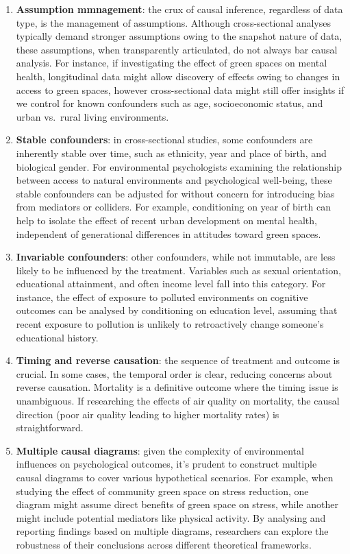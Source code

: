 \documentclass[
  singlecolumn]{article}
\begin{document}
\begin{enumerate}
\def\labelenumi{\arabic{enumi}.}
\item
  \textbf{Assumption mmnagement}: the crux of causal inference,
  regardless of data type, is the management of assumptions. Although
  cross-sectional analyses typically demand stronger assumptions owing
  to the snapshot nature of data, these assumptions, when transparently
  articulated, do not always bar causal analysis. For instance, if
  investigating the effect of green spaces on mental health,
  longitudinal data might allow discovery of effects owing to changes in
  access to green spaces, however cross-sectional data might still offer
  insights if we control for known confounders such as age,
  socioeconomic status, and urban vs.~rural living environments.
\item
  \textbf{Stable confounders}: in cross-sectional studies, some
  confounders are inherently stable over time, such as ethnicity, year
  and place of birth, and biological gender. For environmental
  psychologists examining the relationship between access to natural
  environments and psychological well-being, these stable confounders
  can be adjusted for without concern for introducing bias from
  mediators or colliders. For example, conditioning on year of birth can
  help to isolate the effect of recent urban development on mental
  health, independent of generational differences in attitudes toward
  green spaces.
\item
  \textbf{Invariable confounders}: other confounders, while not
  immutable, are less likely to be influenced by the treatment.
  Variables such as sexual orientation, educational attainment, and
  often income level fall into this category. For instance, the effect
  of exposure to polluted environments on cognitive outcomes can be
  analysed by conditioning on education level, assuming that recent
  exposure to pollution is unlikely to retroactively change someone's
  educational history.
\item
  \textbf{Timing and reverse causation}: the sequence of treatment and
  outcome is crucial. In some cases, the temporal order is clear,
  reducing concerns about reverse causation. Mortality is a definitive
  outcome where the timing issue is unambiguous. If researching the
  effects of air quality on mortality, the causal direction (poor air
  quality leading to higher mortality rates) is straightforward.
\item
  \textbf{Multiple causal diagrams}: given the complexity of
  environmental influences on psychological outcomes, it's prudent to
  construct multiple causal diagrams to cover various hypothetical
  scenarios. For example, when studying the effect of community green
  space on stress reduction, one diagram might assume direct benefits of
  green space on stress, while another might include potential mediators
  like physical activity. By analysing and reporting findings based on
  multiple diagrams, researchers can explore the robustness of their
  conclusions across different theoretical frameworks.
\end{enumerate}
\end{document}
